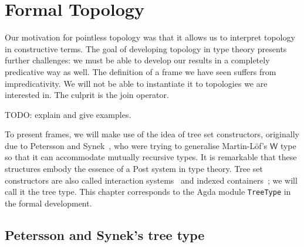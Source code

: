 \chapter{Formal Topology}\label{chap:formal-topo}

Our motivation for pointless topology was that it allows us to interpret topology in
constructive terms. The goal of developing topology in type theory presents further
challenges: we must be able to develop our results in a completely predicative way as
well. The definition of a frame we have seen suffers from impredicativity. We will not be
able to instantiate it to topologies we are interested in. The culprit is the join
operator.

TODO: explain and give examples.

To present frames, we will make use of the idea of tree set constructors, originally due
to Petersson and Synek~\cite{tree-sets}, who were trying to generalise Martin-Löf's
$\mathsf{W}$ type so that it can accommodate mutually recursive types. It is remarkable
that these structures embody the essence of a Post system in type theory. Tree set
constructors are also called interaction systems~\cite{hancock-interaction-systems} and
indexed containers~\cite{indexed-containers}; we will call it the tree type. This chapter
corresponds to the Agda module \texttt{TreeType} in the formal development.

\section{Petersson and Synek's tree type}

